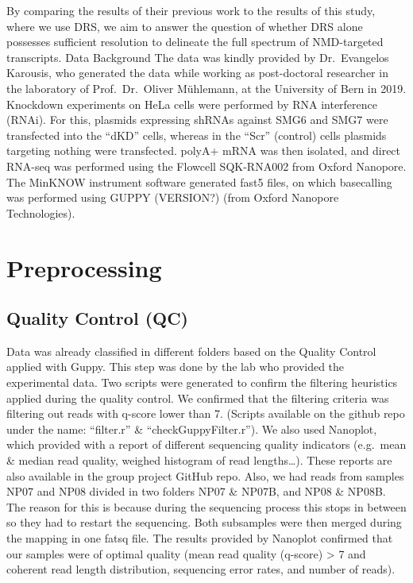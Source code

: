 \documentclass[
  letterpaper,
  DIV=11,
  numbers=noendperiod]{scrartcl}
\begin{document}
By comparing the results of their previous work to the results of this
study, where we use DRS, we aim to answer the question of whether DRS
alone possesses sufficient resolution to delineate the full spectrum of
NMD-targeted transcripts. Data Background The data was kindly provided
by Dr.~Evangelos Karousis, who generated the data while working as
post-doctoral researcher in the laboratory of Prof.~Dr.~Oliver
Mühlemann, at the University of Bern in 2019. Knockdown experiments on
HeLa cells were performed by RNA interference (RNAi). For this, plasmids
expressing shRNAs against SMG6 and SMG7 were transfected into the
``dKD'' cells, whereas in the ``Scr'' (control) cells plasmids targeting
nothing were transfected. polyA+ mRNA was then isolated, and direct
RNA-seq was performed using the Flowcell SQK-RNA002 from Oxford
Nanopore. The MinKNOW instrument software generated fast5 files, on
which basecalling was performed using GUPPY (VERSION?) (from Oxford
Nanopore Technologies).

\hypertarget{preprocessing}{%
\section{Preprocessing}\label{preprocessing}}

\hypertarget{quality-control-qc}{%
\subsection{Quality Control (QC)}\label{quality-control-qc}}

Data was already classified in different folders based on the Quality
Control applied with Guppy. This step was done by the lab who provided
the experimental data. Two scripts were generated to confirm the
filtering heuristics applied during the quality control. We confirmed
that the filtering criteria was filtering out reads with q-score lower
than 7. (Scripts available on the github repo under the name:
``filter.r'' \& ``checkGuppyFilter.r''). We also used Nanoplot, which
provided with a report of different sequencing quality indicators
(e.g.~mean \& median read quality, weighed histogram of read
lengths\ldots). These reports are also available in the group project
GitHub repo. Also, we had reads from samples NP07 and NP08 divided in
two folders NP07 \& NP07B, and NP08 \& NP08B. The reason for this is
because during the sequencing process this stops in between so they had
to restart the sequencing. Both subsamples were then merged during the
mapping in one fatsq file. The results provided by Nanoplot confirmed
that our samples were of optimal quality (mean read quality (q-score)
\textgreater{} 7 and coherent read length distribution, sequencing error
rates, and number of reads).
\end{document}
